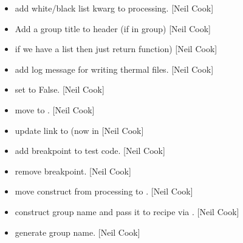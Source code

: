 \documentclass[a4paper,10pt,english]{report}
\begin{document}
\begin{itemize}
\item {} 
 \sphinxhyphen{} add white/black list
kwarg to processing. {[}Neil Cook{]}

\item {} 
 \sphinxhyphen{} Add a group title to header (if in group)
{[}Neil Cook{]}

\item {} 
 \sphinxhyphen{} if we have a list then just return
 function) {[}Neil Cook{]}

\item {} 
 \sphinxhyphen{} add log message for writing
thermal files. {[}Neil Cook{]}

\item {} 
 \sphinxhyphen{} set
 to False. {[}Neil Cook{]}

\item {} 
 \sphinxhyphen{} move  to .
{[}Neil Cook{]}

\item {} 
 \sphinxhyphen{} update link to  (now in
 {[}Neil Cook{]}

\item {} 
 \sphinxhyphen{} add breakpoint to test code. {[}Neil Cook{]}

\item {} 
 \sphinxhyphen{} remove breakpoint. {[}Neil Cook{]}

\item {} 
 \sphinxhyphen{} move  construct from processing
to . {[}Neil Cook{]}

\item {} 
 \sphinxhyphen{} construct group name and pass
it to recipe via . {[}Neil Cook{]}

\item {} 
 \sphinxhyphen{} generate group name. {[}Neil Cook{]}


\end{itemize}
\end{document}
